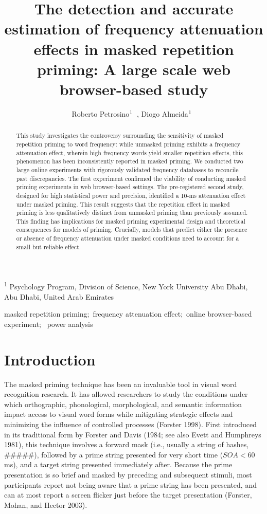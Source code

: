\documentclass[
]{interact}
\title{The detection and accurate estimation of frequency attenuation
effects in masked repetition priming: A large scale web browser-based
study}
\author{Roberto
Petrosino$\textsuperscript{1}$~\orcidlink{0000-0002-8502-3070}, Diogo
Almeida$\textsuperscript{1}$~\orcidlink{0000-0003-4674-8092}}
\begin{document}
\captionsetup{labelsep=space}
\maketitle
\textsuperscript{1} Psychology Program, Division of Science, New York
University Abu Dhabi, Abu Dhabi, United Arab Emirates
\begin{abstract}
This study investigates the controversy surrounding the sensitivity of
masked repetition priming to word frequency: while unmasked priming
exhibits a frequency attenuation effect, wherein high frequency words
yield smaller repetition effects, this phenomenon has been
inconsistently reported in masked priming. We conducted two large online
experiments with rigorously validated frequency databases to reconcile
past discrepancies. The first experiment confirmed the viability of
conducting masked priming experiments in web browser-based settings. The
pre-registered second study, designed for high statistical power and
precision, identified a 10-ms attenuation effect under masked priming.
This result suggests that the repetition effect in masked priming is
less qualitatively distinct from unmasked priming than previously
assumed. This finding has implications for masked priming experimental
design and theoretical consequences for models of priming. Crucially,
models that predict either the presence or absence of frequency
attenuation under masked conditions need to account for a small but
reliable effect.
\end{abstract}
\begin{keywords}
\def\sep{;\ }
masked repetition priming\sep frequency attenuation effect\sep online
browser-based experiment\sep 
power analysis
\end{keywords}


\section{Introduction}\label{sec-intro}

The masked priming technique has been an invaluable tool in visual word
recognition research. It has allowed researchers to study the conditions
under which orthographic, phonological, morphological, and semantic
information impact access to visual word forms while mitigating
strategic effects and minimizing the influence of controlled processes
(Forster 1998). First introduced in its traditional form by Forster and
Davis (1984; see also Evett and Humphreys 1981), this technique involves
a forward mask (i.e., usually a string of hashes, \#\#\#\#\#), followed
by a prime string presented for very short time (\(SOA < 60\) ms), and a
target string presented immediately after. Because the prime
presentation is so brief and masked by preceding and subsequent stimuli,
most participants report not being aware that a prime string has been
presented, and can at most report a screen flicker just before the
target presentation (Forster, Mohan, and Hector 2003).
\end{document}
